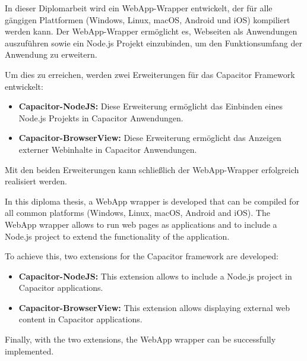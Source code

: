 
In dieser Diplomarbeit wird ein WebApp-Wrapper entwickelt, der für alle gängigen Plattformen (Windows, Linux, macOS, Android und iOS) kompiliert werden kann.
Der WebApp-Wrapper ermöglicht es, Webseiten als Anwendungen auszuführen sowie ein Node.js Projekt einzubinden, um den Funktionsumfang der Anwendung zu erweitern.

Um dies zu erreichen, werden zwei Erweiterungen für das Capacitor Framework entwickelt:

\begin{itemize}
    \item \textbf{Capacitor-NodeJS:} Diese Erweiterung ermöglicht das Einbinden eines Node.js Projekts in Capacitor Anwendungen.
    \item \textbf{Capacitor-BrowserView:} Diese Erweiterung ermöglicht das Anzeigen externer Webinhalte in Capacitor Anwendungen.
\end{itemize}

Mit den beiden Erweiterungen kann schließlich der WebApp-Wrapper erfolgreich realisiert werden.


In this diploma thesis, a WebApp wrapper is developed that can be compiled for all common platforms (Windows, Linux, macOS, Android and iOS).
The WebApp wrapper allows to run web pages as applications and to include a Node.js project to extend the functionality of the application.

To achieve this, two extensions for the Capacitor framework are developed:

\begin{itemize}
    \item \textbf{Capacitor-NodeJS:} This extension allows to include a Node.js project in Capacitor applications.
    \item \textbf{Capacitor-BrowserView:} This extension allows displaying external web content in Capacitor applications.
\end{itemize}

Finally, with the two extensions, the WebApp wrapper can be successfully implemented.
